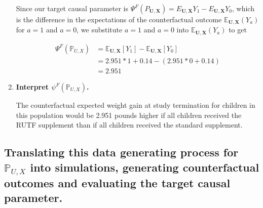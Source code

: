 \documentclass{article}\usepackage[]{graphicx}\usepackage[]{xcolor}
\begin{document}
\begin{enumerate}[label=\textbf{\arabic*.}]
Since our target causal parameter is $\Psi^F(P_{\bm{U},\bm{X}}) = E_{\bm{U},\bm{X}}Y_1 - E_{\bm{U},\bm{X}}Y_0$, which is the difference in the expectations of the counterfactual outcome $\mathbb{E}_{\bm{U},\bm{X}}(Y_a)$ for $a = 1$ and $a = 0$, we substitute $a = 1$ and $a = 0$ into $\mathbb{E}_{\bm{U},\bm{X}}(Y_a)$ to get



\begin{align*}
\Psi^F(\mathbb{P}_{U,X}) &= \mathbb{E}_{\bm{U},\bm{X}}[Y_1] - \mathbb{E}_{\bm{U},\bm{X}}[Y_0] \\
&= 2.951*1 + 0.14 - 
  (2.951*0 + 0.14) \\
&= 2.951
\end{align*}
      
      \item \textbf{Interpret $\psi^F(\mathbb{P}_{U,X})$.}
      
      The counterfactual expected weight gain at study termination for children in this population would be 2.951 pounds higher if all children received the RUTF supplement than if all children received the standard supplement.
  
    \end{enumerate}
    
  \subsection{Translating this data generating process for $\mathbb{P}_{U,X}$ into simulations, generating counterfactual outcomes and evaluating the target causal parameter.}
  
\end{document}
